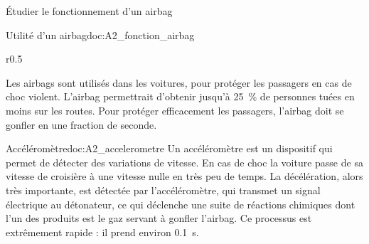 \teteTermStssRout
{}

\begin{objectifs}
  \item Étudier le fonctionnement d'un airbag
\end{objectifs}


\begin{doc}{Utilité d'un airbag}{doc:A2_fonction_airbag}
  \begin{wrapfigure}{r}{0.5\linewidth}  
    \centering
    \vspace*{-24pt}
     \\[4pt]
  \end{wrapfigure}
  
  Les airbags sont utilisés dans les voitures, pour protéger les passagers en cas de choc violent.
  L'airbag permettrait d'obtenir jusqu'à \qty{25}{\percent} de personnes tuées en moins sur les routes.
  Pour protéger efficacement les passagers, l'airbag doit se gonfler en une fraction de seconde.
\end{doc}

\begin{doc}{Accéléromètre}{doc:A2_accelerometre}
  Un accéléromètre est un dispositif qui permet de détecter des variations de vitesse.
  En cas de choc la voiture passe de sa vitesse de croisière à une vitesse nulle en très peu de temps.
  La décélération, alors très importante, est détectée par l'accéléromètre, qui transmet un signal électrique au détonateur, ce qui déclenche une suite de réactions chimiques dont l'un des produits est le gaz servant à gonfler l'airbag.
  Ce processus est extrêmement rapide : il prend environ \qty{0,1}{\s}.
\end{doc}


